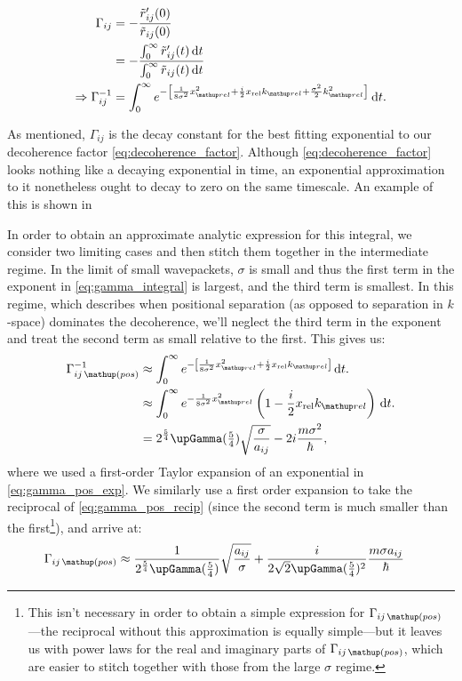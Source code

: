 \begin{align}
\Gamma_{ij} &= -\frac {\tilde r_{ij}^\prime(0)} {\tilde r_{ij}(0)}\\
&= -\frac {\int_0^\infty \tilde r_{ij}^\prime(t)\,\dd t} {\int_0^\infty \tilde r_{ij}(t)\, \dd t}\\
\Rightarrow \Gamma_{ij}^{-1}&= \int_0^\infty e^{-\left[
        \frac{1} {8\sigma^2} x_\up{rel}^2
      + \frac i2 x_{\mathrm{rel}} k_\up{rel}
      + \frac{\sigma^2}{2} k_\up{rel}^2
      \right]}\, \dd t.\label{eq:gamma_integral}
\end{align}

As mentioned, $\Gamma_{ij}$ is the decay constant for the best fitting exponential to our decoherence factor \eqref{eq:decoherence_factor}. Although \eqref{eq:decoherence_factor} looks nothing like a decaying exponential in time, an exponential approximation to it nonetheless ought to decay to zero on the same timescale. An example of this is shown in 

In order to obtain an approximate analytic expression for this integral, we consider two limiting cases and then stitch them together in the intermediate regime. In the limit of small wavepackets, $\sigma$ is small and thus the first term in the exponent in \eqref{eq:gamma_integral} is largest, and the third term is smallest. In this regime, which describes when positional separation (as opposed to separation in $k$-space) dominates the decoherence, we'll neglect the third term in the exponent and treat the second term as small relative to the first.
This gives us:
\begin{align}
\Gamma_{ij\,\up{(pos)}}^{-1} &\approx \int_0^\infty e^{-\left[
        \frac{1} {8\sigma^2} x_\up{rel}^2
      + \frac i2 x_{\mathrm{rel}} k_\up{rel}
      \right]}\, \dd t.\\
      &\approx \int_0^\infty e^{-
              \frac{1} {8\sigma^2} x_\up{rel}^2}\left(1 - \frac i2 x_{\mathrm{rel}} k_\up{rel}\right)\, \dd t.\label{eq:gamma_pos_exp}\\
      &= 2^{\frac54}\upGamma(\tfrac54)\sqrt{\frac{\sigma}{a_{ij}}} - 2i\frac{m \sigma^2}{\hbar},\label{eq:gamma_pos_recip}
\end{align}
where we used a first-order Taylor expansion of an exponential in \eqref{eq:gamma_pos_exp}. We similarly use a first order expansion to take the reciprocal of \eqref{eq:gamma_pos_recip} (since the second term is much smaller than the first\footnote{This isn't necessary in order to obtain a simple expression for $\Gamma_{ij\,\up{(pos)}}$---the reciprocal without this approximation is equally simple---but it leaves us with power laws for the real and imaginary parts of $\Gamma_{ij\,\up{(pos)}}$, which are easier to stitch together with those from the large $\sigma$ regime.}), and arrive at:
\begin{align}
\Gamma_{ij\,\up{(pos)}} &\approx \frac1{2^{\frac54}\upGamma(\tfrac54)}\sqrt{\frac{a_{ij}}{\sigma}}
+ \frac i {2\sqrt{2}\upGamma(\tfrac54)^2} \frac{m\sigma a_{ij}}{\hbar}\label{eq:gamma_pos_final}%
\end{align}

